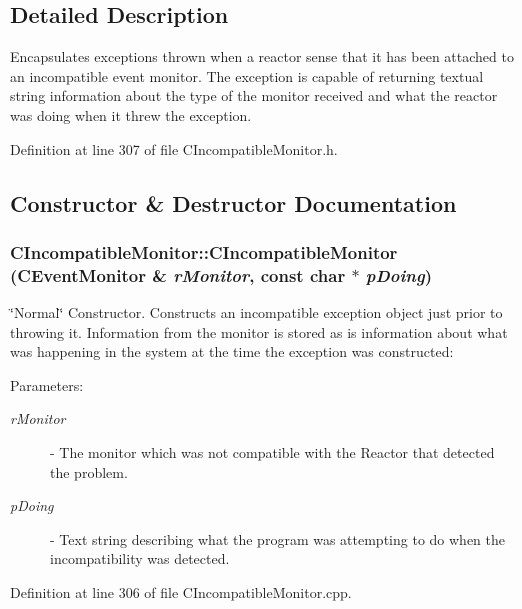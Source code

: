 \subsection{Detailed Description}
Encapsulates exceptions thrown when a reactor sense that it has been attached to an incompatible event monitor. The exception is capable of returning textual string information about the type of the monitor received and what the reactor was doing when it threw the exception. 



Definition at line 307 of file CIncompatible\-Monitor.h.

\subsection{Constructor \& Destructor Documentation}
\subsubsection{\setlength{\rightskip}{0pt plus 5cm}CIncompatible\-Monitor::CIncompatible\-Monitor ({\bf CEvent\-Monitor} \& {\em r\-Monitor}, const char $\ast$ {\em p\-Doing})}\label{classCIncompatibleMonitor_a0}


\char`\"{}Normal\char`\"{} Constructor. Constructs an incompatible exception object just prior to throwing it. Information from the monitor is stored as is information about what was happening in the system at the time the exception was constructed:\begin{Desc}
\item[Parameters: ]\par
\begin{description}
\item[{\em 
r\-Monitor}]- The monitor which was not compatible with the Reactor that detected the problem. \item[{\em 
p\-Doing}]- Text string describing what the program was attempting to do when the incompatibility was detected. \end{description}
\end{Desc}


Definition at line 306 of file CIncompatible\-Monitor.cpp.
